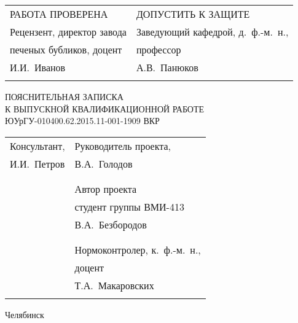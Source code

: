 \begin{titlepage}



\begin{spacing}{0.9}

\begin{tabularx}{\textwidth}{ XX }
РАБОТА ПРОВЕРЕНА & ДОПУСТИТЬ К ЗАЩИТЕ \\
Рецензент, директор завода & Заведующий кафедрой, д.~ф.-м.~н., \\
печеных бубликов, доцент & профессор \\
И.И.~Иванов & А.В.~Панюков \\
 &  \\
\end{tabularx}

\vspace{1cm}

\begin{center}

\end{center}

\vspace{1cm}

\begin{center}
ПОЯСНИТЕЛЬНАЯ ЗАПИСКА \\
К ВЫПУСКНОЙ КВАЛИФИКАЦИОННОЙ РАБОТЕ \\
ЮУрГУ-010400.62.2015.11-001-1909 ВКР
\end{center}

\vspace{1cm}

\begin{tabularx}{\textwidth}{ XX }
  Консультант, & Руководитель проекта, \\
  И.И.~Петров & В.А.~Голодов \\
   &  \\
  & \\
  & Автор проекта \\
  & студент группы ВМИ-413 \\
  & В.А.~Безбородов \\
  &  \\
  & \\
  & Нормоконтролер, к.~ф.-м.~н., \\
  & доцент \\
  & Т.А.~Макаровских \\
  &  \\
\end{tabularx}

\end{spacing}

\vspace{2cm}

\begin{center}
Челябинск 
\end{center}

\end{titlepage}